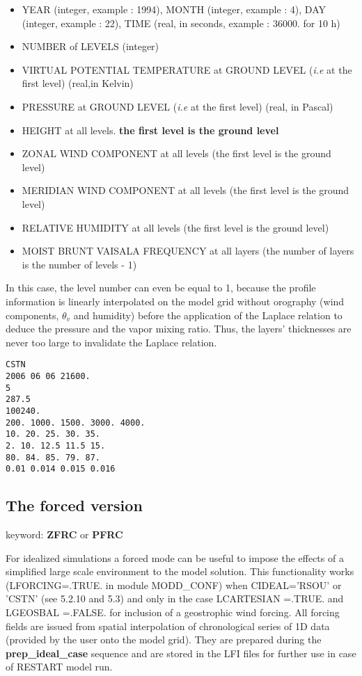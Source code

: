 \begin{itemize}
\item YEAR (integer, example : 1994), MONTH (integer, example : 4), DAY
(integer, example : 22), TIME (real, in seconds, example : 36000. for 10 h)

\item NUMBER of LEVELS (integer)
\item VIRTUAL POTENTIAL TEMPERATURE  at GROUND LEVEL 
({\it i.e} at the first level) (real,in Kelvin)
\item PRESSURE  at GROUND LEVEL ({\it i.e} at the first level) (real, in Pascal)
\item HEIGHT  at all levels. {\bf the first level is the  ground level}
\item ZONAL WIND COMPONENT at all  levels (the first level is the  ground level)
\item MERIDIAN WIND COMPONENT at all  levels (the first level is the  ground level)
\item RELATIVE HUMIDITY at all  levels (the first level is the  ground level)
\item MOIST BRUNT VAISALA FREQUENCY at all layers (the number of layers is the
number of levels - 1)
\end{itemize}

In this case, the level number can even be equal to 1, because the profile
information is linearly interpolated on the model grid without orography
(wind components, $\theta _v$ and humidity) before the application of the Laplace
relation to deduce the pressure and the vapor mixing ratio. Thus, the
layers' thicknesses are never too large to invalidate the Laplace relation.

\vspace{0.5cm}

\begin{verbatim}
CSTN
2006 06 06 21600.
5
287.5
100240.
200. 1000. 1500. 3000. 4000. 
10. 20. 25. 30. 35.
2. 10. 12.5 11.5 15.
80. 84. 85. 79. 87.
0.01 0.014 0.015 0.016
\end{verbatim}


\subsection{The forced version} \label{ss:forced}

keyword: {\bf ZFRC} or {\bf PFRC}

For idealized simulations a forced mode can be useful to impose the effects of
a simplified large scale environment to the model solution. This functionality
works (LFORCING=.TRUE. in module MODD\_CONF) when CIDEAL='RSOU' or 'CSTN'
(see 5.2.10 and 5.3) and only in the case LCARTESIAN =.TRUE. and
LGEOSBAL =.FALSE. for inclusion of a geostrophic wind forcing.
All forcing fields are  issued from spatial interpolation of chronological series of 1D data (provided by the user onto the model grid). They are prepared during the
{\bf prep\_ideal\_case} sequence and are stored in the LFI files for further use
in case of RESTART model run.

